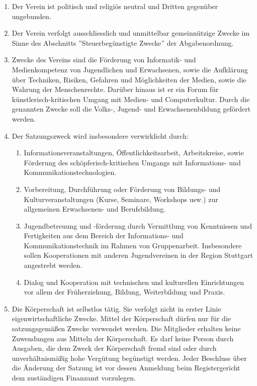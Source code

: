 \documentclass[a4paper, 12pt]{scrartcl}
\begin{document}
     \begin{enumerate}
	  \item Der Verein ist politisch und religiös neutral und Dritten gegenüber ungebunden.
	  \item Der Verein verfolgt ausschliesslich und unmittelbar gemeinnützige Zwecke im Sinne des Abschnitts ”Steuerbegünstigte Zwecke” der Abgabenordnung.
	  \item Zwecke des Vereins sind die Förderung von Informatik- und Medienkompetenz von Jugendlichen und Erwachsenen, sowie die Aufklärung über Techniken, Risiken, Gefahren und Möglichkeiten der Medien, sowie die Wahrung der Menschenrechte. Darüber hinaus ist er ein Forum für künstlerisch-kritischen Umgang mit Medien- und Computerkultur. Durch die genannten Zwecke soll die Volks-, Jugend- und Erwachsenenbildung gefördert werden.  
  
	  \item Der Satzungszweck wird insbesondere verwirklicht durch:  
	       \begin{enumerate}
		    \item Informationsveranstaltungen, Öffentlichkeitsarbeit, Arbeitskreise, sowie Förderung des schöpferisch-kritischen Umgangs mit Informations- und Kommunikationstechnologien.  
		    \item Vorbereitung, Durchführung oder Förderung von Bildungs- und Kulturveranstaltungen (Kurse, Seminare, Workshops usw.) zur allgemeinen Erwachsenen- und Berufsbildung.  
		    \item Jugendbetreuung und -förderung durch Vermittlung von Kenntnissen und Fertigkeiten aus dem Bereich der Informations- und Kommunikationstechnik im Rahmen von Gruppenarbeit. Insbesondere sollen Kooperationen mit anderen Jugendvereinen in der Region Stuttgart angestrebt werden.  
		    \item Dialog und Kooperation mit technischen und kulturellen Einrichtungen vor allem der Früherziehung, Bildung, Weiterbildung und Praxis.  
	       \end{enumerate}
  
	  \item Die Körperschaft ist selbstlos tätig. Sie verfolgt nicht in erster Linie eigenwirtschaftliche Zwecke. Mittel der Körperschaft dürfen nur für die satzungsgemäßen Zwecke verwendet werden. Die Mitglieder erhalten keine Zuwendungen aus Mitteln der Körperschaft. Es darf keine Person durch Ausgaben, die dem Zweck der Körperschaft fremd sind oder durch unverhältnismäßig hohe Vergütung begünstigt werden. Jeder Beschluss über die Änderung der Satzung ist vor dessen Anmeldung beim Registergericht dem zuständigen Finanzamt vorzulegen.
     \end{enumerate}
\end{document}
